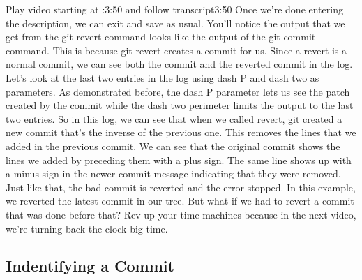 	Play video starting at :3:50 and follow transcript3:50
	Once we're done entering the description, we can exit and save as usual. You'll notice the output that we get from the git revert command looks like the output of the git commit command. This is because git revert creates a commit for us. Since a revert is a normal commit, we can see both the commit and the reverted commit in the log. Let's look at the last two entries in the log using dash P and dash two as parameters. As demonstrated before, the dash P parameter lets us see the patch created by the commit while the dash two perimeter limits the output to the last two entries. So in this log, we can see that when we called revert, git created a new commit that's the inverse of the previous one. This removes the lines that we added in the previous commit. We can see that the original commit shows the lines we added by preceding them with a plus sign. The same line shows up with a minus sign in the newer commit message indicating that they were removed. Just like that, the bad commit is reverted and the error stopped. In this example, we reverted the latest commit in our tree. But what if we had to revert a commit that was done before that? Rev up your time machines because in the next video, we're turning back the clock big-time.
	
	\subsection{Indentifying a Commit}
	
